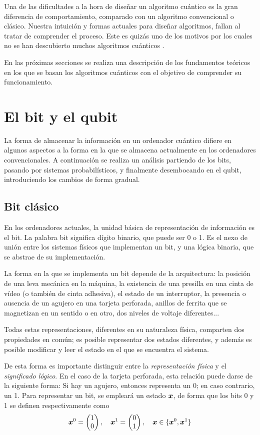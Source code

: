 Una de las dificultades a la hora de diseñar un algoritmo cuántico es la gran 
diferencia de comportamiento, comparado con un algoritmo convencional o clásico.  
Nuestra intuición y formas actuales para diseñar algoritmos, fallan al tratar de 
comprender el proceso. Este es quizás uno de los motivos por los cuales no se 
han descubierto muchos algoritmos cuánticos \cite{shor03}.

En las próximas secciones se realiza una descripción de los fundamentos teóricos 
en los que se basan los algoritmos cuánticos con el objetivo de comprender su 
funcionamiento.

\section{El bit y el qubit}
La forma de almacenar la información en un ordenador cuántico difiere en algunos 
aspectos a la forma en la que se almacena actualmente en los ordenadores 
convencionales. A continuación se realiza un análisis partiendo de los bits, 
pasando por sistemas probabilísticos, y finalmente desembocando en el qubit, 
introduciendo los cambios de forma gradual.

\subsection{Bit clásico}
En los ordenadores actuales, la unidad básica de representación de información 
es el bit. La palabra bit significa dígito binario, que puede ser 0 o 1. Es el 
nexo de unión entre los sistemas físicos que implementan un bit, y una lógica 
binaria, que se abstrae de su implementación.

La forma en la que se implementa un bit depende de la arquitectura: la posición 
de una leva mecánica en la máquina, la existencia de una presilla en una cinta 
de vídeo (o también de cinta adhesiva), el estado de un interruptor, la 
presencia o ausencia de un agujero en una tarjeta perforada, anillos de ferrita 
que se magnetizan en un sentido o en otro, dos niveles de voltaje diferentes...

Todas estas representaciones, diferentes en su naturaleza física, comparten dos 
propiedades en común; es posible representar dos estados diferentes, y además es 
posible modificar y leer el estado en el que se encuentra el sistema.

De esta forma es importante distinguir entre la \textit{representación física} y 
el \textit{significado lógico}. En el caso de la tarjeta perforada, esta 
relación puede darse de la siguiente forma: Si hay un agujero, entonces 
representa un 0; en caso contrario, un 1. Para representar un bit, se empleará 
un estado $\boldsymbol{x}$, de forma que los bits 0 y 1 se definen respectivamente como
$$ \boldsymbol{x}^0 = \begin{pmatrix} 1 \\ 0 \end{pmatrix}, \quad \boldsymbol{x}^1 = \begin{pmatrix} 0 \\ 1 \end{pmatrix}, \quad
\boldsymbol{x} \in \{\boldsymbol{x}^0, \boldsymbol{x}^1\} $$


